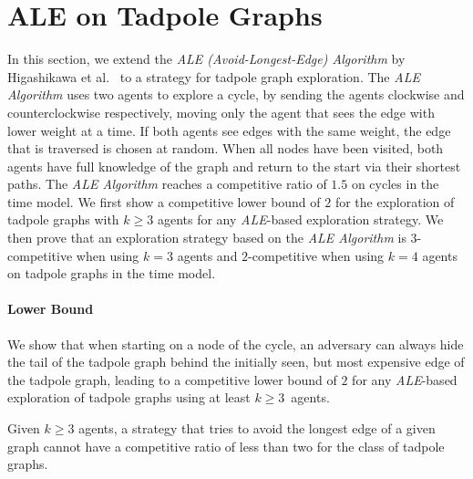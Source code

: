 \section{ALE on Tadpole Graphs} \label{ale_tad}

In this section, we extend the \textit{ALE (Avoid-Longest-Edge) Algorithm} by Higashikawa et al.\ \cite{Higashikawa2012} to a strategy for tadpole graph exploration.
The \textit{ALE Algorithm} uses two agents to explore a cycle, by sending the agents clockwise and counterclockwise respectively,
moving only the agent that sees the edge with lower weight at a time. If both agents see edges with the same weight, the edge that is traversed is chosen at random. 
When all nodes have been visited, both agents have full knowledge of the graph and return to the start via their shortest paths. The \textit{ALE Algorithm} reaches a 
competitive ratio of $1.5$ on cycles in the time model.
We first show a competitive lower bound of $2$ for the exploration of tadpole graphs with $k\geq3$ agents for any \textit{ALE}-based exploration strategy.
We then prove that an exploration strategy based on the \textit{ALE Algorithm} is $3$-competitive when using $k=3$ agents and $2$-competitive when using $k=4$ agents 
on tadpole graphs in the time model. 

\paragraph*{Lower Bound}

We show that when starting on a node of the cycle, an adversary can
always hide the tail of the tadpole graph behind the initially seen, but most expensive edge of the tadpole graph, leading to a competitive lower bound
of $2$ for any \textit{ALE}-based exploration of tadpole graphs using at least $k\geq3$~agents.

\begin{theorem}\label{AleLower}
    Given $k\geq3$ agents, a strategy that tries to avoid the longest edge of a given graph cannot have a competitive ratio of 
    less than two for the class of tadpole graphs.
\end{theorem}

